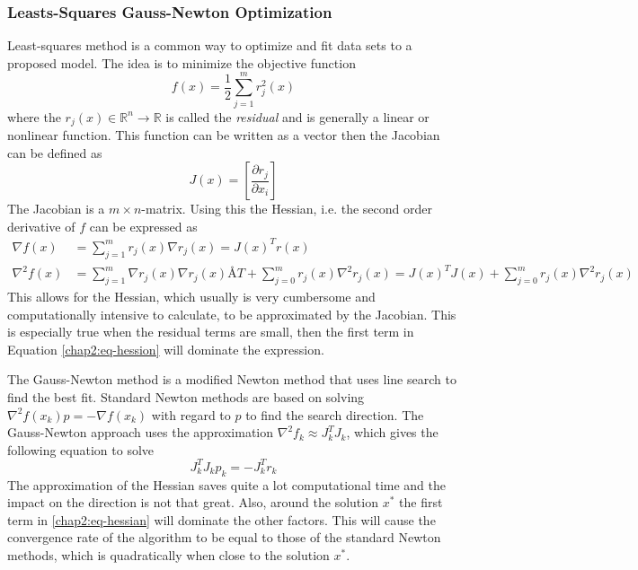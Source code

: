 \subsubsection{Leasts-Squares Gauss-Newton Optimization}
\label{chap2:subsec-gauss-newton}
Least-squares method is a common way to optimize and fit data sets to a proposed model.
The idea is to minimize the objective function 
\begin{equation}
    f(x) = \frac{1}{2} \sum_{j = 1}^m r^2_j (x)
\end{equation}
where the $r_j(x) \in \mathbb{R}^n \rightarrow \mathbb{R}$ is called the \emph{residual} and
is generally a linear or nonlinear function. This function can be written as a vector then
the Jacobian can be defined as
\begin{equation}
    J (x) = \left[ \frac{\partial r_j}{\partial x_i} \right]
\end{equation}
The Jacobian is a $m \times n$-matrix. Using this the Hessian, i.e. the second order
derivative of $f$ can be expressed as
\begin{align}
    \nabla f(x) &= \sum_{j = 1}^m r_j(x) \nabla r_j(x) = J(x)^T r(x) \\
    \nabla^2 f(x) &= \sum_{j=1}^m \nabla r_j (x) \nabla r_j(x)Å T + \sum_{j=0}^m r_j(x)
    \nabla^2 r_j(x) = J(x)^T J(x) + \sum_{j= 0}^m r_j(x) \nabla^2 r_j(x)
    \label{chap2:eq-hessian}
\end{align}
This allows for the Hessian, which usually is very cumbersome and computationally
intensive to calculate, to be approximated by the Jacobian. This is especially true when
the residual terms are small, then the first term in Equation \eqref{chap2:eq-hession}
will dominate the expression. 

The Gauss-Newton method is a modified Newton method that uses line search to find the
best fit. Standard Newton methods are based on solving $\nabla^2 f(x_k) p = -\nabla
f(x_k)$ with regard to $p$ to find the search direction. The Gauss-Newton approach uses
the approximation $\nabla^2 f_k \approx  J_k^T J_k$, which gives the following equation to
solve
\begin{equation}
    J_k^T J_k p_k = - J_k^T r_k
\end{equation}
The approximation of the Hessian saves quite a lot computational time and the impact on
the direction is not that great. Also, around the solution $x^*$ the first term in
\eqref{chap2:eq-hessian} will dominate the other factors. This will cause the convergence
rate of the algorithm to be equal to those of the standard Newton methods, which is
quadratically when close to the solution $x^*$.\cite{optreg} 

